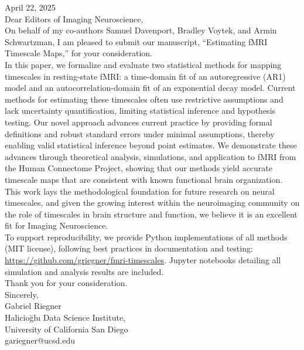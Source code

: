 \documentclass[docs/main.tex]{subfiles}
\begin{document}
\setlength{\parindent}{0pt}
\thispagestyle{empty}
\vspace*{\fill}

\hfill April 22, 2025\\

\noindent Dear Editors of Imaging Neuroscience,\\

On behalf of my co-authors Samuel Davenport, Bradley Voytek, and Armin Schwartzman, I am pleased to submit our manuscript, ``Estimating fMRI Timescale Maps,'' for your consideration.\\

In this paper, we formalize and evaluate two statistical methods for mapping timescales in resting-state fMRI: a time-domain fit of an autoregressive (AR1) model and an autocorrelation-domain fit of an exponential decay model. Current methods for estimating these timescales often use restrictive assumptions and lack uncertainty quantification, limiting statistical inference and hypothesis testing. Our novel approach advances current practice by providing formal definitions and robust standard errors under minimal assumptions, thereby enabling valid statistical inference beyond point estimates. We demonstrate these advances through theoretical analysis, simulations, and application to fMRI from the Human Connectome Project, showing that our methods yield accurate timescale maps that are consistent with known functional brain organization. This work lays the methodological foundation for future research on neural timescales, and given the growing interest within the neuroimaging community on the role of timescales in brain structure and function, we believe it is an excellent fit for Imaging Neuroscience.\\

To support reproducibility, we provide Python implementations of all methods (MIT license), following best practices in documentation and testing: \href{https://github.com/griegner/fmri-timescales}{https://github.com/griegner/fmri-timescales}. Jupyter notebooks detailing all simulation and analysis results are included.\\

Thank you for your consideration.\\

Sincerely,\\[4ex]

Gabriel Riegner\\
Halicio\u{g}lu Data Science Institute,\\
University of California San Diego\\
gariegner@ucsd.edu

\vspace*{\fill}
\end{document}
